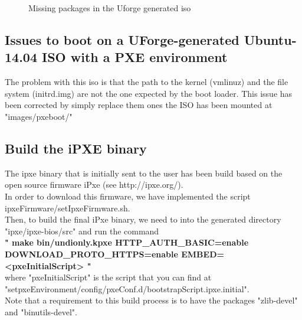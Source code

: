 \documentclass[12pt]{article}											%
\begin{document}
	\begin{figure}[t]
	\begin{center}
		\caption{Missing packages in the Uforge generated iso}
	\end{center}
	\end{figure}


\subsection{Issues to boot on a UForge-generated Ubuntu-14.04 ISO with a PXE environment}
The problem with this iso is that the path to the kernel (vmlinuz) and the file system (initrd.img) are not the one expected by the boot loader.   This issue has been corrected by simply replace them ones the ISO has been mounted at "images/pxeboot/"


\subsection{Build the iPXE binary}\label{buildIpxeBinary}
	The ipxe binary that is initially sent to the user has been build based on the open source firmware iPxe (see http://ipxe.org/).\\
	In order to download this firmware, we have implemented the script ipxeFirmware/setIpxeFirmware.sh.\\
    Then, to build the final iPxe binary, we need to into the generated directory "ipxe/ipxe-bios/src" and run the command\\ \textbf{" make bin/undionly.kpxe HTTP\_AUTH\_BASIC=enable DOWNLOAD\_PROTO\_HTTPS=enable EMBED=<pxeInitialScript> "}\\
    where "pxeInitialScript" is the script that you can find at "setpxeEnvironment/config/pxeConf.d/bootstrapScript.ipxe.initial".\\
	Note that a requirement to this build process is to have the packages "zlib-devel" and "binutils-devel".
\end{document}
